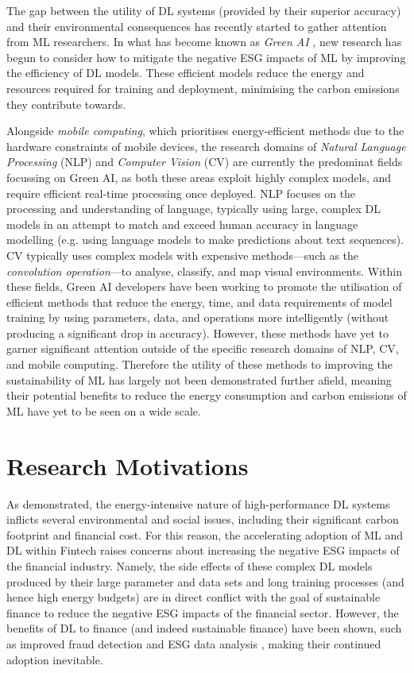 \documentclass[a4paper, 11pt]{report}
\begin{document}
    The gap between the utility of DL systems (provided by their superior accuracy) and their environmental consequences has recently started to gather attention from ML researchers. In what has become known as \emph{Green AI} \citep{schwartz-2019}, new research has begun to consider how to mitigate the negative ESG impacts of ML by improving the efficiency of DL models. These efficient models reduce the energy and resources required for training and deployment, minimising the carbon emissions they contribute towards. 

    Alongside \emph{mobile computing}, which prioritises energy-efficient methods due to the hardware constraints of mobile devices, the research domains of \emph{Natural Language Processing} (NLP) and \emph{Computer Vision} (CV) are currently the predominat fields focussing on Green AI, as both these areas exploit highly complex models, and require efficient real-time processing once deployed. NLP focuses on the processing and understanding of language, typically using large, complex DL models in an attempt to match and exceed human accuracy in language modelling (e.g. using language models to make predictions about text sequences). CV typically uses complex models with expensive methods---such as the \emph{convolution operation}---to analyse, classify, and map visual environments. Within these fields, Green AI developers have been working to promote the utilisation of efficient methods that reduce the energy, time, and data requirements of model training by using parameters, data, and operations more intelligently (without producing a significant drop in accuracy). However, these methods have yet to garner significant attention outside of the specific research domains of NLP, CV, and mobile computing. Therefore the utility of these methods to improving the sustainability of ML has largely not been demonstrated further afield, meaning their potential benefits to reduce the energy consumption and carbon emissions of ML have yet to be seen on a wide scale.


    \section{Research Motivations}
    \label{section: motivations}

    As demonstrated, the energy-intensive nature of high-performance DL systems inflicts several environmental and social issues, including their significant carbon footprint and financial cost. For this reason, the accelerating adoption of ML and DL within Fintech raises concerns about increasing the negative ESG impacts of the financial industry. Namely, the side effects of these complex DL models produced by their large parameter and data sets and long training processes (and hence high energy budgets) are in direct conflict with the goal of sustainable finance to reduce the negative ESG impacts of the financial sector. However, the benefits of DL to finance (and indeed sustainable finance) have been shown, such as improved fraud detection \citep{sadgali-2019} and ESG data analysis \citep{mehra-2022}, making their continued adoption inevitable. 
\end{document}
